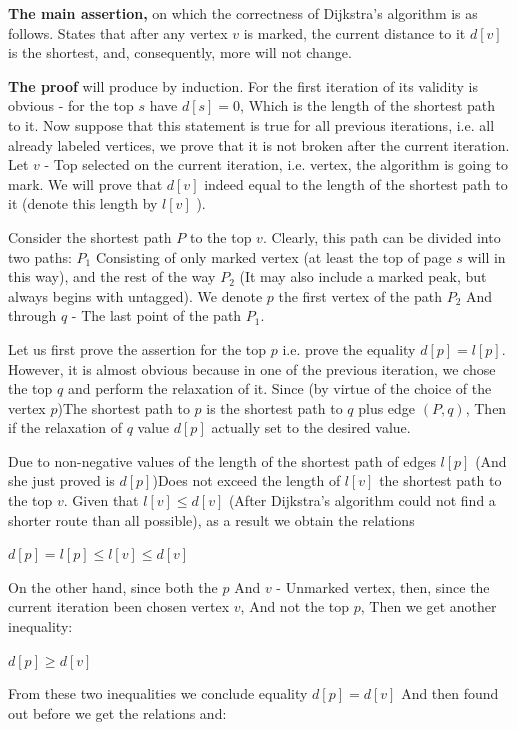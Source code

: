 \textbf{The main assertion,} on which the correctness of Dijkstra's algorithm is as follows. States that after any vertex $v$ is marked, the current distance to it $d [v]$ is the shortest, and, consequently, more will not change.

\textbf{The proof} will produce by induction. For the first iteration of its validity is obvious - for the top $s$ have $d [s] = 0$, Which is the length of the shortest path to it. Now suppose that this statement is true for all previous iterations, i.e. all already labeled vertices, we prove that it is not broken after the current iteration. Let $v$ - Top selected on the current iteration, i.e. vertex, the algorithm is going to mark. We will prove that $d [v]$ indeed equal to the length of the shortest path to it (denote this length by $l [v]$ ).

Consider the shortest path $P$ to the top $v$. Clearly, this path can be divided into two paths: $P_1$ Consisting of only marked vertex (at least the top of page $s$ will in this way), and the rest of the way $P_2$ (It may also include a marked peak, but always begins with untagged). We denote $p$ the first vertex of the path $P_2$ And through $q$ - The last point of the path $P_1$.

Let us first prove the assertion for the top $p$ i.e. prove the equality $d [p] = l [p]$. However, it is almost obvious because in one of the previous iteration, we chose the top $q$ and perform the relaxation of it. Since (by virtue of the choice of the vertex $p$)The shortest path to $p$ is the shortest path to $q$ plus edge $(P, q)$, Then if the relaxation of $q$ value $d [p]$ actually set to the desired value.

Due to non-negative values ​​of the length of the shortest path of edges $l [p]$ (And she just proved is $d [p]$)Does not exceed the length of $l [v]$ the shortest path to the top $v$. Given that $l [v] \le d [v]$ (After Dijkstra's algorithm could not find a shorter route than all possible), as a result we obtain the relations

$d [p] = l [p] \le l [v] \le d [v]$

On the other hand, since both the $p$ And $v$ - Unmarked vertex, then, since the current iteration been chosen vertex $v$, And not the top $p$, Then we get another inequality:

$d [p] \ge d [v]$

From these two inequalities we conclude equality $d [p] = d [v]$ And then found out before we get the relations and:

